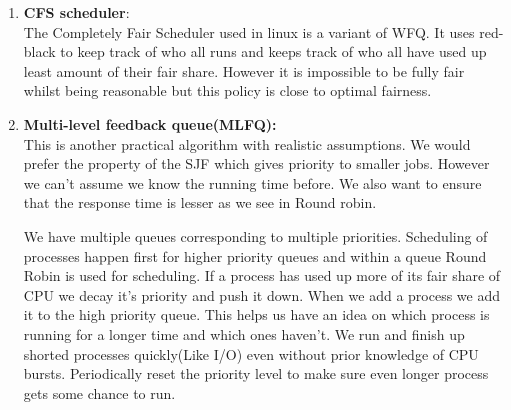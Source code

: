 \documentclass[12pt]{article}
\begin{document}
\begin{enumerate}
\item 
\textbf{CFS scheduler}:\\The Completely Fair Scheduler used in linux is a variant of WFQ. It uses red-black to keep track of who all runs and keeps track of who all have used up least amount of their fair share.
However it is impossible to be fully fair whilst being reasonable but this policy is close to optimal fairness.


\item \textbf{ Multi-level feedback queue(MLFQ):} \\
This is another practical algorithm with realistic assumptions. We would prefer the property of the SJF which gives priority to smaller jobs. However we can't assume we know the running time before.
We also want to ensure that the response time is lesser as we see in Round robin. 

We have multiple queues corresponding to multiple priorities. Scheduling of processes happen first for higher priority queues and within a queue Round Robin is used for scheduling. If a process has used up more of its fair share of CPU we decay it's priority and push it down. When we 
add a process we add it to the high priority queue. This helps us have an idea on which process is running for a longer time and which ones haven't. We run and finish up shorted processes quickly(Like I/O) even without prior knowledge of CPU bursts. Periodically reset the priority level to make sure even longer
process gets some chance to run.
\end{enumerate}
\end{document}
